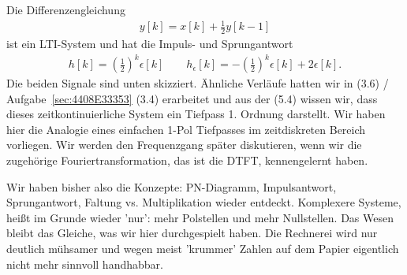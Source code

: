\begin{Loesung}
Die Differenzengleichung
\begin{align}
y[k] = x[k] + \frac{1}{2} y[k-1]
\end{align}
ist ein LTI-System und hat die Impuls- und Sprungantwort
\begin{align}
h[k] = \left(\frac{1}{2}\right)^k \epsilon[k]\qquad
h_\epsilon[k] = - \left(\frac{1}{2}\right)^k \epsilon[k] + 2 \epsilon[k].
\end{align}
Die beiden Signale sind unten skizziert. Ähnliche Verläufe hatten wir in
 (3.6) / Aufgabe~\ref{sec:4408E33353} (3.4)
erarbeitet und aus der  (5.4) wissen wir, dass dieses
zeitkontinuierliche System ein Tiefpass 1. Ordnung darstellt.
%
Wir haben hier die Analogie eines einfachen 1-Pol Tiefpasses im zeitdiskreten
Bereich vorliegen. Wir werden den Frequenzgang später diskutieren, wenn
wir die zugehörige Fouriertransformation, das ist die DTFT, kennengelernt haben.
%

%
Wir haben bisher also die Konzepte: PN-Diagramm, Impulsantwort, Sprungantwort,
Faltung vs. Multiplikation wieder entdeckt.
%
Komplexere Systeme, heißt im Grunde wieder 'nur': mehr Polstellen und mehr
Nullstellen. Das Wesen bleibt das Gleiche, was wir hier durchgespielt
haben. Die Rechnerei wird nur deutlich mühsamer und wegen meist 'krummer' Zahlen
auf dem Papier eigentlich nicht mehr sinnvoll handhabbar.


\end{Loesung}
